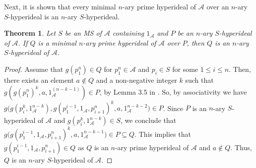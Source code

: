 \documentclass[preprint,review,10pt]{amsart}
\newtheorem{theorem}{Theorem}[section]
\theoremstyle{definition}
\theoremstyle{remark}
\numberwithin{equation}{section}
\begin{document}
Next, it is shown that  every minimal $n$-ary prime hyperideal of $\mathscr{A}$ over an $n$-ary $S$-hyperideal is an $n$-ary $S$-hyperideal.
\begin{theorem} \label{6}
Let $S$ be an MS of  $\mathscr{A}$ containing $1_\mathscr{A} $ and  $P$ be an $n$-ary $S$-hyperideal of  $\mathscr{A}$.  If $Q$ is a minimal $n$-ary prime hyperideal of  $\mathscr{A}$ over $P$, then $Q$ is an $n$-ary $S$-hyperideal of  $\mathscr{A}$.
\end{theorem}
\begin{proof}
Assume that $g(p_1^n) \in Q$ for $p_1^n \in \mathscr{A}$ and $p_i \in S$ for some $1 \leq i \leq n$. Then, there exists an element  $a \notin Q$ and a non-negative integer $k$ such that $g(g(p_1^n)^k,a,1_\mathscr{A}^{(n-k-1)}) \in P$, by Lemma 3.5 in \cite{mah2}. So, by associativity we have $g \big(g(p_i^k,1_\mathscr{A}^{n-k}), g(p_1^{i-1},1_\mathscr{A},p_{i+1}^n)^k,a, 1_\mathscr{A}^{n-k-2} \big) \in P$. Since $P$ is an $n$-ary $S$-hyperideal of  $\mathscr{A}$ and $g(p_i^k,1_\mathscr{A}^{n-k}) \in S$, we conclude that $g \big( g(p_1^{i-1},1_\mathscr{A},p_{i+1}^n)^k,a, 1_\mathscr{A}^{n-k-1} \big) \in P \subseteq Q$. This implies that $g(p_1^{i-1},1_\mathscr{A},p_{i+1}^n) \in Q$ as $Q$ is an $n$-ary prime hyperideal of  $\mathscr{A}$ and $a \notin Q$. Thus, $Q$ is an $n$-ary $S$-hyperideal of  $\mathscr{A}$.
\end{proof}
\end{document}
